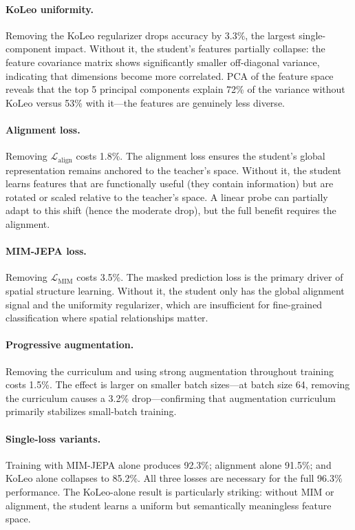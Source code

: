 \documentclass{article}
\begin{document}
\paragraph{KoLeo uniformity.} Removing the KoLeo regularizer drops accuracy by 3.3\%, the largest single-component impact. Without it, the student's features partially collapse: the feature covariance matrix shows significantly smaller off-diagonal variance, indicating that dimensions become more correlated. PCA of the feature space reveals that the top 5 principal components explain 72\% of the variance without KoLeo versus 53\% with it---the features are genuinely less diverse.

\paragraph{Alignment loss.} Removing $\mathcal{L}_{\text{align}}$ costs 1.8\%. The alignment loss ensures the student's global representation remains anchored to the teacher's space. Without it, the student learns features that are functionally useful (they contain information) but are rotated or scaled relative to the teacher's space. A linear probe can partially adapt to this shift (hence the moderate drop), but the full benefit requires the alignment.

\paragraph{MIM-JEPA loss.} Removing $\mathcal{L}_{\text{MIM}}$ costs 3.5\%. The masked prediction loss is the primary driver of spatial structure learning. Without it, the student only has the global alignment signal and the uniformity regularizer, which are insufficient for fine-grained classification where spatial relationships matter.

\paragraph{Progressive augmentation.} Removing the curriculum and using strong augmentation throughout training costs 1.5\%. The effect is larger on smaller batch sizes---at batch size 64, removing the curriculum causes a 3.2\% drop---confirming that augmentation curriculum primarily stabilizes small-batch training.

\paragraph{Single-loss variants.} Training with MIM-JEPA alone produces 92.3\%; alignment alone 91.5\%; and KoLeo alone collapses to 85.2\%. All three losses are necessary for the full 96.3\% performance. The KoLeo-alone result is particularly striking: without MIM or alignment, the student learns a uniform but semantically meaningless feature space.
\end{document}
